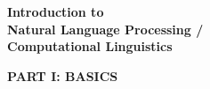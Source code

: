 \documentclass{article}
\def\part#1#2{\vfil\Huge\textbf{PART #1: #2}}
\begin{document}
\vfil\LARGE\textbf{Introduction to\\ Natural Language Processing /\\
  Computational Linguistics}\vfil





\part{I}{BASICS}





\end{document}
